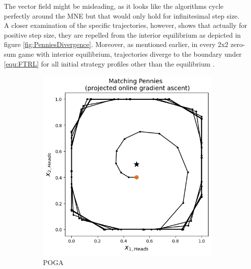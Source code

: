 The vector field might be misleading, as it looks like the algorithms cycle perfectly around the MNE but that would only hold for infinitesimal step size. \\

A closer examination of the specific trajectories, however, shows that actually for positive step size, they are repelled from the interior equilibrium as depicted in figure \ref{fig:PenniesDivergence}. Moreover, as mentioned earlier, in every 2x2 zero-sum game with interior equilibrium, trajectories diverge to the boundary under \ref{equ:FTRL} for all initial strategy profiles other than the equilibrium \cite{bailey}. \\

\begin{figure}[H]
 \captionsetup{justification=centering}
\centering
\begin{subfigure}{.5\textwidth}
    \centering
    \includegraphics[width=\textwidth]{logos/Pennies5.png}
    \caption{POGA}
\end{subfigure}%
\begin{subfigure}{.5\textwidth}
    \centering

\end{subfigure}
\end{figure}
